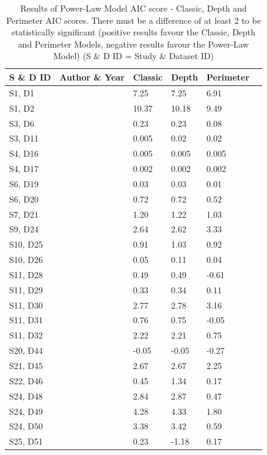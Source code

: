 \begin{table}[h]
    \caption{Results of Power-Law Model AIC score - Classic, Depth and Perimeter AIC scores. There must be a difference of at least 2 to be statistically significant (positive results favour the Classic, Depth and Perimeter Models, negative results favour the Power-Law Model) (S \& D ID = Study \& Dataset ID)}
    \label{crouch}
    \begin{tabular}{  l  p{6cm} p{1cm}  p{1cm} p{1cm} p{1cm}}
        \toprule
\textbf{S \& D ID} 
&\textbf{Author \& Year}
&\textbf{Classic}      
& \textbf{Depth}
& \textbf{Perimeter} \\\midrule
S1, D1
&\cite{li2020island}
& 7.25
& 7.25
& 6.91 \\\hline
S1, D2
&\cite{li2020island}
& 10.37
& 10.18
& 9.49 \\\hline
S3, D6
&\cite{darcy2018island} 
& 0.23
& 0.23
& 0.08 \\\hline
S3, D11
&\cite{darcy2018island} 
& 0.005
& 0.02
& 0.02\\\hline
S4, D16
&\cite{delgado2018experimentally} 
& 0.005
& 0.005
& 0.005 \\\hline
S4, D17
&\cite{delgado2018experimentally} 
& 0.002
& 0.002
& 0.002 \\\hline
S6, D19
&\cite{glassman2017theory} 
& 0.03
& 0.03
& 0.01 \\\hline
S6, D20
&\cite{glassman2017theory} 
& 0.72
& 0.72
& 0.52 \\\hline
S7, D21
&\cite{varbiro2017functional} 
& 1.20
& 1.22
& 1.03 \\\hline
S9, D24
&\cite{bolgovics2016species} 
& 2.64
& 2.62
& 3.33 \\\hline
S10, D25
&\cite{article} 
& 0.91
& 1.03
& 0.92 \\\hline
S10, D26 
&\cite{article} 
& 0.05
& 0.11
& 0.04 \\\hline
S11, D28
&\cite{jean2016equilibrium} 
& 0.49
& 0.49
& -0.61 \\\hline
S11, D29
&\cite{jean2016equilibrium} 
& 0.33
& 0.34
& 0.11 \\\hline
S11, D30
&\cite{jean2016equilibrium} 
& 2.77
& 2.78
& 3.16 \\\hline
S11, D31 
&\cite{jean2016equilibrium} 
& 0.76
& 0.75
& -0.05 \\\hline
S11, D32
&\cite{jean2016equilibrium} 
& 2.22
& 2.21
& 0.75 \\\hline
S20, D44
&\cite{peay2007strong} 
& -0.05
& -0.05
& -0.27 \\\hline
S21, D45
&\cite{van2006bacterial} 
& 2.67
& 2.67
& 2.25 \\\hline
S22, D46
&\cite{bell2005larger} 
& 0.45
& 1.34
& 0.17 \\\hline
S24, D48
&\cite{van2005island} 
& 2.84
& 2.87
& 0.47 \\\hline
S24, D49
&\cite{van2005island} 
& 4.28
& 4.33
& 1.80 \\\hline
S24, D50
&\cite{van2005island} 
& 3.38
& 3.42
& 0.59 \\\hline
S25, D51
&\cite{karatayev2005community} 
& 0.23
& -1.18
& 0.17  \\
        \bottomrule
    \end{tabular}
\end{table}

